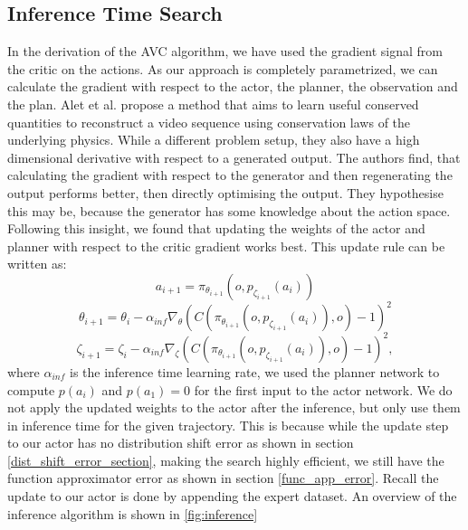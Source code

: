\subsection{Inference Time Search}
\label{sec:inf_time_search}
In the derivation of the AVC algorithm, we have used the gradient signal from the critic on the actions. As our approach is completely parametrized, we can calculate 
the gradient with respect to the actor, the planner, the observation and the plan. Alet et al. \cite{alet2021noether} propose a method that aims 
to learn useful conserved quantities to reconstruct a video sequence 
using conservation laws of the underlying physics. While a different problem setup, they also have a high dimensional derivative with respect to a 
generated output. The authors find, that 
calculating the gradient with respect to the generator and then regenerating the output performs better, then directly optimising the output. They hypothesise this 
may be, because the generator has some knowledge about the action space. Following this insight, we found that updating the weights of the actor and planner 
with respect to the critic gradient works best. This update rule can be written as:
\begin{equation*}
    a_{i+1} = \pi_{\theta_{i+1}}(o, p_{\zeta_{i+1}}(a_i))
\end{equation*}
\begin{equation*}
    \theta_{i+1} = \theta_i - \alpha_{inf} \nabla_{\theta} (C(\pi_{\theta_{i+1}}(o, p_{\zeta_{i+1}}(a_i)), o) - 1)^2
\end{equation*}
\begin{equation}
    \zeta_{i+1} = \zeta_i - \alpha_{inf} \nabla_{\zeta} (C(\pi_{\theta_{i+1}}(o, p_{\zeta_{i+1}}(a_i)), o) - 1)^2,
\end{equation}
where $\alpha_{inf}$ is the inference time learning rate, we used the planner network to compute $p(a_i)$ and $p(a_1) = 0$ for the first input to the actor network. 
We do not apply the updated weights to the actor after the inference, but only use them in inference time for the given trajectory. This is because while the update step to our 
actor has no distribution shift error as shown in section \ref{dist_shift_error_section}, making the search highly efficient, we still have the function approximator error as 
shown in section \ref{func_app_error}. Recall the update to our actor is done by appending the expert dataset. An overview of the inference 
algorithm is shown in \ref{fig:inference}

